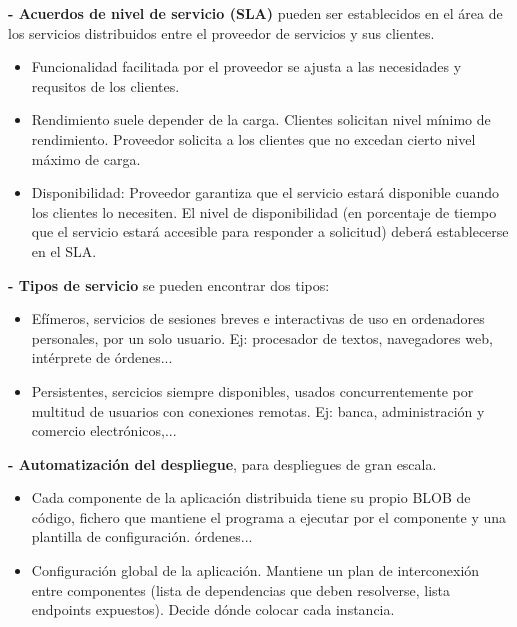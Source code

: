 \documentclass[12pt]{amsart}
\begin{document}
    \smallskip
    
    \textbf{- Acuerdos de nivel de servicio (SLA)} pueden ser establecidos en el área de los servicios distribuidos entre el proveedor de servicios y sus clientes.
    
    \begin{itemize}
    
    \item  Funcionalidad facilitada por el proveedor se ajusta a las necesidades y requsitos de los clientes.
    
    \item  Rendimiento suele depender de la carga. Clientes solicitan nivel mínimo de rendimiento. Proveedor solicita a los clientes que no excedan cierto nivel máximo de carga.
    
    \item  Disponibilidad: Proveedor garantiza que el servicio estará disponible cuando los clientes lo necesiten. El nivel de disponibilidad (en porcentaje de tiempo que el servicio estará accesible para responder a  solicitud) deberá establecerse en el SLA.
    
    \end{itemize}
    
    \textbf{- Tipos de servicio} se pueden encontrar dos tipos:
    \begin{itemize}
    
    \item  Efímeros, servicios de sesiones breves e interactivas de uso en ordenadores personales, por un solo usuario. Ej: procesador de textos, navegadores web, intérprete de órdenes...
    
    \item  Persistentes, sercicios siempre disponibles, usados concurrentemente por multitud de usuarios con conexiones remotas. Ej: banca, administración y comercio electrónicos,...
    \end{itemize}
    
    \textbf{- Automatización del despliegue}, para despliegues de gran escala. \begin{itemize}
    
    \item  Cada componente de la aplicación distribuida tiene su propio BLOB de código, fichero que mantiene el programa a ejecutar por el componente y una plantilla de configuración. órdenes...
    
    \item  Configuración global de la aplicación. Mantiene un plan de interconexión entre componentes (lista de dependencias que deben resolverse, lista endpoints expuestos). Decide dónde colocar cada instancia. 
    \end{itemize}
    
\end{document}
